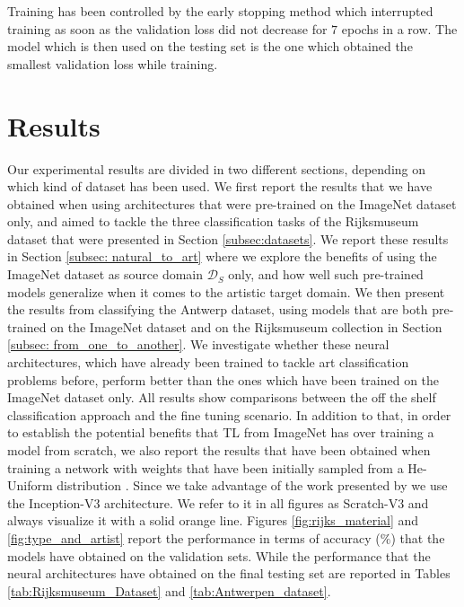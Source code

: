Training has been controlled by the early stopping method \cite{caruana2001overfitting} which interrupted training as soon as the validation loss did not decrease for $7$ epochs in a row. The model which is then used on the testing set is the one which obtained the smallest validation loss while training.


\section{Results}
\label{sec:ch_4_results}

Our experimental results are divided in two different sections, depending on which kind of dataset has been used. We first report the results that we have obtained when using architectures that were pre-trained on the ImageNet dataset only, and aimed to tackle the three classification tasks of the Rijksmuseum dataset that were presented in Section \ref{subsec:datasets}. We report these results in Section \ref{subsec: natural_to_art} where we explore the benefits of using the ImageNet dataset as source domain $\mathcal{D}_S$ only, and how well such pre-trained models generalize when it comes to the artistic target domain. We then present the results from classifying the Antwerp dataset, using models that are both pre-trained on the ImageNet dataset and on the Rijksmuseum collection in Section \ref{subsec: from_one_to_another}. We investigate whether these neural architectures, which have already been trained to tackle art classification problems before, perform better than the ones which have been trained on the ImageNet dataset only.    
All results show comparisons between the off the shelf classification approach and the fine tuning scenario. In addition to that, in order to establish the potential benefits that TL from ImageNet has over training a model from scratch, we also report the results that have been obtained when training a network with weights that have been initially sampled from a He-Uniform distribution \cite{he2015delving}. Since we take advantage of the work presented by \citet{bidoiadeep} we use the Inception-V3 architecture. We refer to it in all figures as Scratch-V3 and always visualize it with a solid orange line. Figures \ref{fig:rijks_material} and \ref{fig:type_and_artist} report the performance in terms of accuracy ($\%$) that the models have obtained on the validation sets. While the performance that the neural architectures have obtained on the final testing set are reported in Tables \ref{tab:Rijksmuseum_Dataset} and \ref{tab:Antwerpen_dataset}. 


